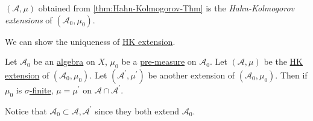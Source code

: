 \begin{definition}[HK extension]\label{def:HK-extension}
	\((\mathcal{A} , \mu )\) obtained from \autoref{thm:Hahn-Kolmogorov-Thm} is the \emph{Hahn-Kolmogorov extensions} of \((\mathcal{A} _0, \mu _0)\).
\end{definition}

We can show the uniqueness of \hyperref[def:HK-extension]{HK extension}.

\begin{theorem}\label{thm:uniqueness-of-HK-extension}
	Let \(\mathcal{A}_0\) be an \hyperref[def:algebra]{algebra} on \(X\), \(\mu _0\) be a \hyperref[def:pre-measure]{pre-measure} on \(\mathcal{A} _0\). Let \((\mathcal{A} , \mu)\)
	be the \hyperref[def:HK-extension]{HK extension} of \((\mathcal{A} _0, \mu _0)\). Let \((\mathcal{A} ^\prime , \mu ^\prime )\) be another extension of \((\mathcal{A} _0, \mu _0)\).
	Then if \(\mu _0\) is \hyperref[def:finite-measure]{\(\sigma\)-finite}, \(\mu  = \mu ^\prime \) on \(\mathcal{A} \cap \mathcal{A} ^\prime \).
\end{theorem}
\begin{note}
	Notice that \(\mathcal{A}_0 \subset \mathcal{A}, \mathcal{A} ^\prime \) since they both extend \(\mathcal{A}_0\).
\end{note}
